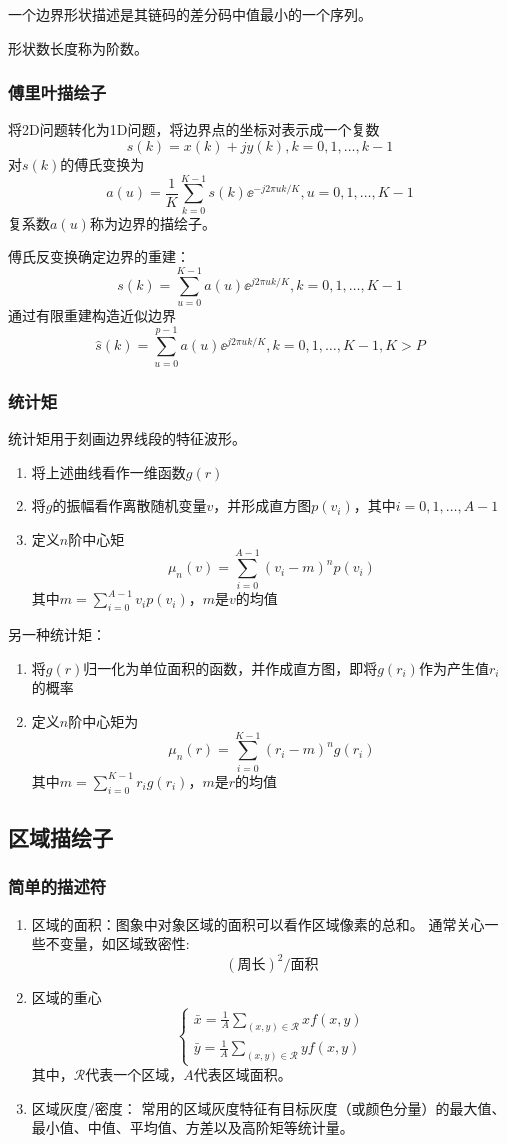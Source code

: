 一个边界形状描述是其链码的差分码中值最小的一个序列。

形状数长度称为阶数。

\subsubsection{傅里叶描绘子}
将2D问题转化为1D问题，将边界点的坐标对表示成一个复数
\[s(k)=x(k)+jy(k),k=0,1,\ldots,k-1\]
对$s(k)$的傅氏变换为
\[a(u)=\frac{1}{K}\sum_{k=0}^{K-1}s(k)\ee^{-j2\pi uk/K},u=0,1,\ldots,K-1\]
复系数$a(u)$称为边界的描绘子。

傅氏反变换确定边界的重建：
\[s(k)=\sum_{u=0}^{K-1}a(u)\ee^{j2\pi uk/K},k=0,1,\ldots,K-1\]
通过有限重建构造近似边界
\[\hat{s}(k)=\sum_{u=0}^{p-1}a(u)\ee^{j2\pi uk/K},k=0,1,\ldots,K-1,K>P\]

\subsubsection{统计矩}
统计矩用于刻画边界线段的特征波形。

\begin{enumerate}
	\item 将上述曲线看作一维函数$g(r)$
	\item 将$g$的振幅看作离散随机变量$v$，并形成直方图$p(v_i)$，其中$i=0,1,\ldots,A-1$
	\item 定义$n$阶中心矩
	\[\mu_n(v)=\sum_{i=0}^{A-1}(v_i-m)^np(v_i)\]
	其中$m=\sum_{i=0}^{A-1}v_ip(v_i)$，$m$是$v$的均值
\end{enumerate}

另一种统计矩：
\begin{enumerate}
	\item 将$g(r)$归一化为单位面积的函数，并作成直方图，即将$g(r_i)$作为产生值$r_i$的概率
	\item 定义$n$阶中心矩为
	\[\mu_n(r)=\sum_{i=0}^{K-1}(r_i-m)^ng(r_i)\]
	其中$m=\sum_{i=0}^{K-1}r_ig(r_i)$，$m$是$r$的均值
\end{enumerate}


\subsection{区域描绘子}
\subsubsection{简单的描述符}
\begin{enumerate}
\item 区域的面积：图象中对象区域的面积可以看作区域像素的总和。
通常关心一些不变量，如区域致密性:
\[(\text{周长})^2/\text{面积}\]

\item 区域的重心
\[\begin{cases}
\bar{x}=\frac{1}{A}\sum_{(x,y)\in\mathcal{R}}xf(x,y)\\
\bar{y}=\frac{1}{A}\sum_{(x,y)\in\mathcal{R}}yf(x,y)
\end{cases}\]
其中，$\mathcal{R}$代表一个区域，$A$代表区域面积。

\item 区域灰度/密度：
常用的区域灰度特征有目标灰度（或颜色分量）的最大值、最小值、中值、平均值、方差以及高阶矩等统计量。
\end{enumerate}

